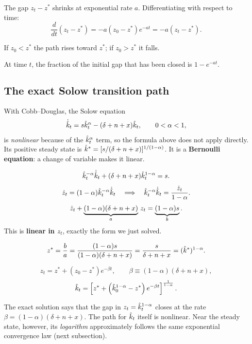 \documentclass[11pt]{article}
\begin{document}
\begin{flatlist}
  \item The gap $z_t - z^*$ shrinks at exponential rate $a$. Differentiating with respect to time:
  \[ \frac{d}{dt}(z_t - z^*) = -a(z_0 - z^*)e^{-at} = -a(z_t - z^*). \]
  \item If $z_0 < z^*$ the path rises toward $z^*$; if $z_0 > z^*$ it falls.
  \item At time $t$, the fraction of the initial gap that has been closed is $1 - e^{-at}$.
\end{flatlist}

\subsection{The exact Solow transition path}
With Cobb--Douglas, the Solow equation
\[
\dot{\hat{k}}_t = s\hat{k}_t^{\alpha} - (\delta+n+x)\hat{k}_t, \qquad 0 < \alpha < 1,
\]
is \emph{nonlinear} because of the $\hat{k}_t^{\alpha}$ term, so the formula above does not apply directly. Its positive steady state is $\hat{k}^* = [s/(\delta+n+x)]^{1/(1-\alpha)}$. It is a \textbf{Bernoulli equation}: a change of variable makes it linear.

\[ \hat{k}_t^{-\alpha}\dot{\hat{k}}_t + (\delta+n+x)\hat{k}_t^{1-\alpha} = s. \]
\[ \dot z_t = (1-\alpha)\hat{k}_t^{-\alpha}\dot{\hat{k}}_t \quad\Longrightarrow\quad \hat{k}_t^{-\alpha}\dot{\hat{k}}_t = \frac{\dot z_t}{1-\alpha}. \]
\[ \dot z_t + \underbrace{(1-\alpha)(\delta+n+x)}_{a}\,z_t = \underbrace{(1-\alpha)s}_{b}. \]
This is \textbf{linear in $z_t$}, exactly the form we just solved.

\[ z^* = \frac{b}{a} = \frac{(1-\alpha)s}{(1-\alpha)(\delta+n+x)} = \frac{s}{\delta+n+x} = (\hat{k}^*)^{1-\alpha}. \]

\begin{keyresult}
\[
z_t = z^* + (z_0 - z^*)e^{-\beta t}, \qquad \beta \equiv (1-\alpha)(\delta+n+x),
\]
\[
\hat{k}_t = \left[z^* + \left(\hat{k}_0^{1-\alpha} - z^*\right)e^{-\beta t}\right]^{\frac{1}{1-\alpha}}.
\]
\end{keyresult}

The exact solution says that the gap in $z_t = \hat{k}_t^{1-\alpha}$ closes at the rate $\beta = (1-\alpha)(\delta+n+x)$. The path for $\hat{k}_t$ itself is nonlinear. Near the steady state, however, its \emph{logarithm} approximately follows the same exponential convergence law (next subsection).
\end{document}
